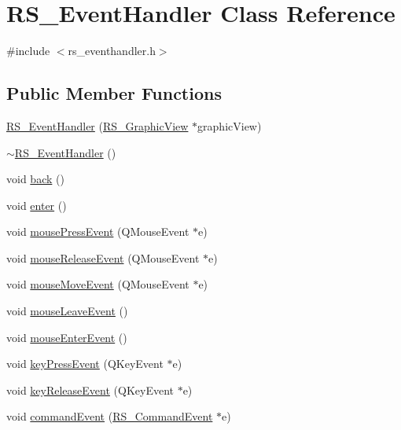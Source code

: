 \hypertarget{classRS__EventHandler}{\section{R\-S\-\_\-\-Event\-Handler Class Reference}
\label{classRS__EventHandler}
}


{\ttfamily \#include $<$rs\-\_\-eventhandler.\-h$>$}

\subsection*{Public Member Functions}
\begin{DoxyCompactItemize}
\item 
\hyperlink{classRS__EventHandler_aa511bd458c84e861916a9aee5d25a271}{R\-S\-\_\-\-Event\-Handler} (\hyperlink{classRS__GraphicView}{R\-S\-\_\-\-Graphic\-View} $\ast$graphic\-View)
\item 
\hyperlink{classRS__EventHandler_ab307f357c79b273e62f4fdd255e594eb}{$\sim$\-R\-S\-\_\-\-Event\-Handler} ()
\item 
void \hyperlink{classRS__EventHandler_aa195dff724e99fcc4d65a263a1ef9aff}{back} ()
\item 
void \hyperlink{classRS__EventHandler_ab60ad9e3fad898e5aeaa2b2acd998ef0}{enter} ()
\item 
void \hyperlink{classRS__EventHandler_a626d180d1c5861509137391c4611251b}{mouse\-Press\-Event} (Q\-Mouse\-Event $\ast$e)
\item 
void \hyperlink{classRS__EventHandler_a4224050d891443439fed7574e3e7b8db}{mouse\-Release\-Event} (Q\-Mouse\-Event $\ast$e)
\item 
void \hyperlink{classRS__EventHandler_a84459b98a8c50cb6aa5e7e3d6aa34977}{mouse\-Move\-Event} (Q\-Mouse\-Event $\ast$e)
\item 
void \hyperlink{classRS__EventHandler_a1061bf11d56bc015cfd9aafc407a3f86}{mouse\-Leave\-Event} ()
\item 
void \hyperlink{classRS__EventHandler_a59ff028c9118a8a37dae2bb181a095f5}{mouse\-Enter\-Event} ()
\item 
void \hyperlink{classRS__EventHandler_a6829855cd44fbfa0ef8d80d153c2275b}{key\-Press\-Event} (Q\-Key\-Event $\ast$e)
\item 
void \hyperlink{classRS__EventHandler_aab9114ff34d6e2b69f3190c1a0591bcf}{key\-Release\-Event} (Q\-Key\-Event $\ast$e)
\item 
void \hyperlink{classRS__EventHandler_a7a5a011570c379b583d0d8b30eb3e841}{command\-Event} (\hyperlink{classRS__CommandEvent}{R\-S\-\_\-\-Command\-Event} $\ast$e)

\end{DoxyCompactItemize}
